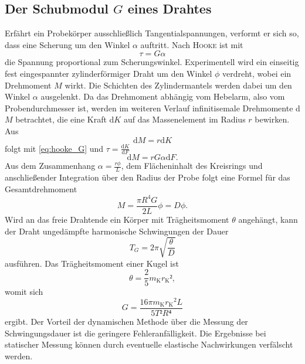 \subsection{Der Schubmodul \texorpdfstring{$G$}{G} eines Drahtes}
Erfährt ein Probekörper ausschließlich Tangentialspannungen, verformt er sich so, dass eine Scherung um den Winkel $\alpha$ auftritt. Nach \textsc{Hooke} ist mit
\begin{equation}
\tau=G\alpha
\label{eq:hooke_G}
\end{equation}
 die Spannung proportional zum Scherungswinkel. 
Experimentell wird ein einseitig fest eingespannter zylinderförmiger Draht um den Winkel $\phi$ verdreht, wobei ein Drehmoment $M$ wirkt. 
Die Schichten des Zylindermantels werden dabei um den Winkel $\alpha$ ausgelenkt. 
Da das Drehmoment abhängig vom Hebelarm, also vom Probendurchmesser ist, werden im weiteren Verlauf infinitisemale Drehmomente d$M$ betrachtet, die eine Kraft d$K$ auf das Massenelement im Radius $r$ bewirken.
Aus
\begin{equation}
\mathup{d}M=r\mathup{d}K
\end{equation}
folgt mit \eqref{eq:hooke_G} und $\tau=\frac{\mathup{d}K}{\mathup{d}F}$
\begin{equation}
\mathup{d}M=rG\alpha\mathup{d}F.
\end{equation}
Aus dem Zusammenhang $\alpha=\frac{r\phi}{L}$, dem Flächeninhalt des Kreisrings und anschließender Integration über den Radius der Probe folgt eine Formel für das Gesamtdrehmoment
\begin{equation}
M=\frac{\pi R^4 G}{2L}\phi=D\phi.
\label{eq:Richtgrosse}
\end{equation}
Wird an das freie Drahtende ein Körper mit Trägheitsmoment $\theta$ angehängt, kann der Draht ungedämpfte harmonische Schwingungen der Dauer 
\begin{equation}
T_{G}=2\pi\sqrt{\frac{\theta}{D}}
\label{eq:t}
\end{equation}
 ausführen. %
 Das Trägheitsmoment einer Kugel ist
\begin{equation}
\theta=\frac{2}{5}m_\mathup{K}{r_\mathup{K}}²,
\label{eq:theta_k}
\end{equation}
 womit sich
\begin{equation}
G=\frac{16\pi m_\mathup{K} {r_\mathup{K}}^2 L}{5T²R⁴}
\label{eq:G}
\end{equation}
ergibt.
Der Vorteil der dynamischen Methode über die Messung der Schwingungsdauer ist die geringere Fehleranfälligkeit. Die Ergebnisse bei statischer Messung können durch eventuelle elastische Nachwirkungen verfälscht werden.

